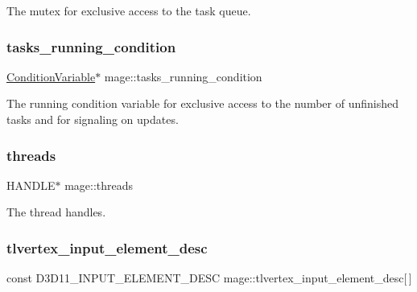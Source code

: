The mutex for exclusive access to the task queue. \hypertarget{namespacemage_a8c04b4285ebbc0fb416b1905c01cf149}{}\label{namespacemage_a8c04b4285ebbc0fb416b1905c01cf149} 
\subsubsection{\texorpdfstring{tasks\+\_\+running\+\_\+condition}{tasks\_running\_condition}}
{\footnotesize\ttfamily \hyperlink{classmage_1_1_condition_variable}{Condition\+Variable}$\ast$ mage\+::tasks\+\_\+running\+\_\+condition\hspace{0.3cm}{\ttfamily [static]}}

The running condition variable for exclusive access to the number of unfinished tasks and for signaling on updates. \hypertarget{namespacemage_a15e9f7d36194ec1b768a82a2294cce6c}{}\label{namespacemage_a15e9f7d36194ec1b768a82a2294cce6c} 
\subsubsection{\texorpdfstring{threads}{threads}}
{\footnotesize\ttfamily H\+A\+N\+D\+LE$\ast$ mage\+::threads\hspace{0.3cm}{\ttfamily [static]}}

The thread handles. \hypertarget{namespacemage_a0f27594da3814c163fe995326acf6c5e}{}\label{namespacemage_a0f27594da3814c163fe995326acf6c5e} 
\subsubsection{\texorpdfstring{tlvertex\+\_\+input\+\_\+element\+\_\+desc}{tlvertex\_input\_element\_desc}}
{\footnotesize\ttfamily const D3\+D11\+\_\+\+I\+N\+P\+U\+T\+\_\+\+E\+L\+E\+M\+E\+N\+T\+\_\+\+D\+E\+SC mage\+::tlvertex\+\_\+input\+\_\+element\+\_\+desc\mbox{[}$\,$\mbox{]}}

